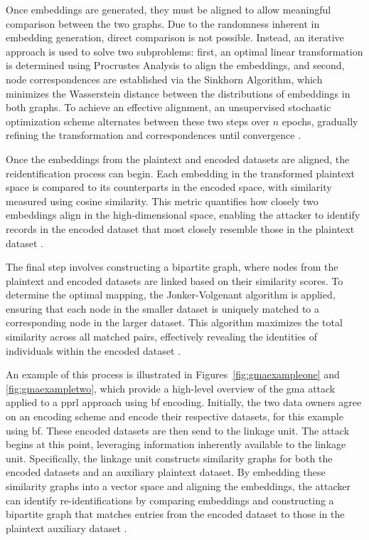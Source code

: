 Once embeddings are generated, they must be aligned to allow meaningful comparison between the two graphs.
Due to the randomness inherent in embedding generation, direct comparison is not possible.
Instead, an iterative approach is used to solve two subproblems: first, an optimal linear transformation is determined using Procrustes Analysis to align the embeddings, and second, node correspondences are established via the Sinkhorn Algorithm, which minimizes the Wasserstein distance between the distributions of embeddings in both graphs.
To achieve an effective alignment, an unsupervised stochastic optimization scheme alternates between these two steps over \(n\) epochs, gradually refining the transformation and correspondences until convergence \cite{schaefer2024}.

Once the embeddings from the plaintext and encoded datasets are aligned, the reidentification process can begin.
Each embedding in the transformed plaintext space is compared to its counterparts in the encoded space, with similarity measured using cosine similarity.
This metric quantifies how closely two embeddings align in the high-dimensional space, enabling the attacker to identify records in the encoded dataset that most closely resemble those in the plaintext dataset \cite{schaefer2024}.

The final step involves constructing a bipartite graph, where nodes from the plaintext and encoded datasets are linked based on their similarity scores.
To determine the optimal mapping, the Jonker-Volgenant algorithm is applied, ensuring that each node in the smaller dataset is uniquely matched to a corresponding node in the larger dataset.
This algorithm maximizes the total similarity across all matched pairs, effectively revealing the identities of individuals within the encoded dataset \cite{schaefer2024}.

An example of this process is illustrated in Figures~\ref{fig:gmaexampleone} and \ref{fig:gmaexampletwo}, which provide a high-level overview of the \ac{gma} attack applied to a \ac{pprl} approach using \ac{bf} encoding.
Initially, the two data owners agree on an encoding scheme and encode their respective datasets, for this example using \ac{bf}.
These encoded datasets are then send to the linkage unit.
The attack begins at this point, leveraging information inherently available to the linkage unit.
Specifically, the linkage unit constructs similarity graphs for both the encoded datasets and an auxiliary plaintext dataset.
By embedding these similarity graphs into a vector space and aligning the embeddings, the attacker can identify re-identifications by comparing embeddings and constructing a bipartite graph that matches entries from the encoded dataset to those in the plaintext auxiliary dataset \cite{schaefer2024}.


